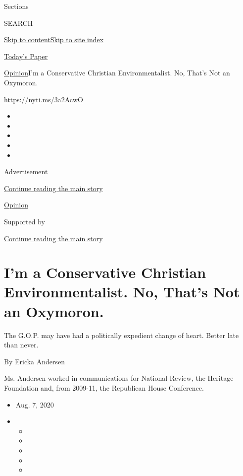 Sections

SEARCH

\protect\hyperlink{site-content}{Skip to
content}\protect\hyperlink{site-index}{Skip to site index}

\href{https://myaccount.nytimes.com/auth/login?response_type=cookie\&client_id=vi}{}

\href{https://www.nytimes.com/section/todayspaper}{Today's Paper}

\href{/section/opinion}{Opinion}\textbar{}I'm a Conservative Christian
Environmentalist. No, That's Not an Oxymoron.

\href{https://nyti.ms/3a2AcwO}{https://nyti.ms/3a2AcwO}

\begin{itemize}
\item
\item
\item
\item
\item
\end{itemize}

Advertisement

\protect\hyperlink{after-top}{Continue reading the main story}

\href{/section/opinion}{Opinion}

Supported by

\protect\hyperlink{after-sponsor}{Continue reading the main story}

\hypertarget{im-a-conservative-christian-environmentalist-no-thats-not-an-oxymoron}{%
\section{I'm a Conservative Christian Environmentalist. No, That's Not
an
Oxymoron.}\label{im-a-conservative-christian-environmentalist-no-thats-not-an-oxymoron}}

The G.O.P. may have had a politically expedient change of heart. Better
late than never.

By Ericka Andersen

Ms. Andersen worked in communications for National Review, the Heritage
Foundation and, from 2009-11, the Republican House Conference.

\begin{itemize}
\item
  Aug. 7, 2020
\item
  \begin{itemize}
  \item
  \item
  \item
  \item
  \item
  \end{itemize}
\end{itemize}

